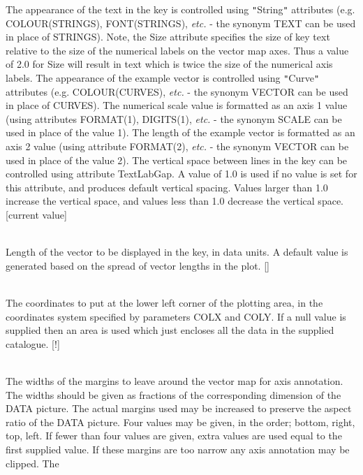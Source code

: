 \documentclass[twoside,11pt]{article}
\renewcommand{\_}{\texttt{\symbol{95}}}
\newcommand{\sstsubsection}[1]{ \item[{#1}] \mbox{} \\}
\newcommand{\sstsubsection}[1]{\item[{#1}]}
\begin{document}
{{{         The appearance of the text in the key is controlled using {\tt "}String{\tt "}
         attributes (e.g. COLOUR(STRINGS), FONT(STRINGS), \emph{etc.} - the synonym
         TEXT can be used in place of STRINGS). Note, the Size attribute
         specifies the size of key text relative to the size of the numerical
         labels on the vector map axes. Thus a value of 2.0 for Size will
         result in text which is twice the size of the numerical axis labels.
         The appearance of the example vector is controlled using {\tt "}Curve{\tt "}
         attributes (e.g. COLOUR(CURVES), \emph{etc.} - the synonym VECTOR can be
         used in place of CURVES). The numerical scale value is formatted as
         an axis 1 value (using attributes FORMAT(1), DIGITS(1), \emph{etc.} - the
         synonym SCALE can be used in place of the value 1). The length of
         the example vector is formatted as an axis 2 value (using attribute
         FORMAT(2), \emph{etc.} - the synonym VECTOR can be used in place of the
         value 2). The vertical space between lines in the key can be
         controlled using attribute TextLabGap. A value of 1.0 is used if
         no value is set for this attribute, and produces default vertical
         spacing. Values larger than 1.0 increase the vertical space, and
         values less than 1.0 decrease the vertical space. [current value]
      }
      \sstsubsection{
         KEYVEC = \_REAL (Read)
      }{
         Length of the vector to be displayed in the key, in data units.
         A default value is generated based on the spread of vector
         lengths in the plot. []
      }
      \sstsubsection{
         LBND(2) = \_REAL (Read)
      }{
         The coordinates to put at the lower left corner of the plotting
         area, in the coordinates system specified by parameters COLX and
         COLY. If a null value is supplied then an area is used which just
         encloses all the data in the supplied catalogue. [!]
      }
      \sstsubsection{
         MARGIN( 4 ) = \_REAL (Read)
      }{
         The widths of the margins to leave around the vector map for axis
         annotation. The widths should be given as fractions of the
         corresponding dimension of the DATA picture.
         The actual margins used may be increased to preserve the aspect
         ratio of the DATA picture. Four values may be given, in the order;
         bottom, right, top, left. If fewer than four values are given,
         extra values are used equal to the first supplied value. If these
         margins are too narrow any axis annotation may be clipped. The
}}}
\end{document}
